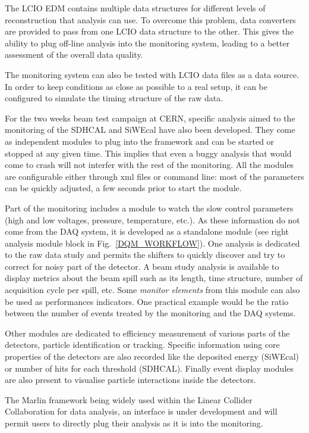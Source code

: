 \documentclass[conference]{IEEEtran}
\begin{document}
The LCIO EDM contains multiple data structures for different levels of reconstruction that analysis can use. To overcome this problem, data converters are provided to pass from one LCIO data structure to the other. This gives the ability to plug off-line analysis into the monitoring system, leading to a better assessment of the overall data quality.

The monitoring system can also be tested with LCIO data files as a data source. In order to keep conditions as close as possible to a real setup, it can be configured to simulate the timing structure of the raw data.

For the two weeks beam test campaign at CERN, specific analysis aimed to the monitoring of the SDHCAL and SiWEcal have also been developed. They come as independent modules to plug into the framework and can be started or stopped at any given time. This implies that even a buggy analysis that would come to crash will not interfer with the rest of the monitoring. All the modules are configurable either through xml files or command line: most of the parameters can be quickly adjusted, a few seconds prior to start the module.

Part of the monitoring includes a module to watch the slow control parameters (high and low voltages, pressure, temperature, etc.). As these information do not come from the DAQ system, it is developed as a standalone module (see right analysis module block in Fig.~\ref{DQM_WORKFLOW}).
One analysis is dedicated to the raw data study and permits the shifters to quickly discover and try to correct for noisy part of the detector. A beam study analysis is available to display metrics about the beam spill such as its length, time structure, number of acquisition cycle per spill, etc. Some \textit{monitor elements} from this module can also be used as performances indicators. One practical example would be the ratio between the number of events treated by the monitoring and the DAQ systems.

Other modules are dedicated to efficiency measurement of various parts of the detectors, particle identification or tracking. Specific information using core properties of the detectors are also recorded like the deposited energy (SiWEcal) or number of hits for each threshold (SDHCAL). Finally event display modules are also present to visualise particle interactions inside the detectors.

The Marlin\cite{MARLIN} framework being widely used within the Linear Collider Collaboration for data analysis, an interface is under development and will permit users to directly plug their analysis as it is into the monitoring.
\end{document}

